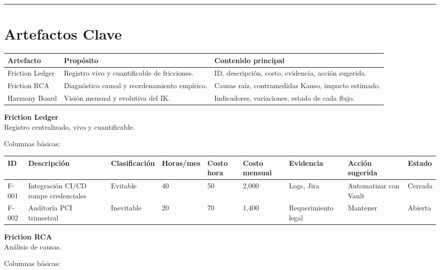 \hrule
\section{Artefactos Clave}

\begin{center}
\begin{tabular}{|p{3.5cm}|p{4.5cm}|p{5cm}|}
\hline
Artefacto & Propósito & Contenido principal \\ \hline
Friction Ledger & Registro vivo y cuantificable de fricciones. & ID, descripción, costo, evidencia, acción sugerida. \\ \hline
Friction RCA & Diagnóstico causal y reordenamiento empírico. & Causas raíz, contramedidas Kanso, impacto estimado. \\ \hline
Harmony Board & Visión mensual y evolutiva del IK. & Indicadores, variaciones, estado de cada flujo. \\ \hline
\end{tabular}
\end{center}

\textbf{Friction Ledger} \\
Registro centralizado, vivo y cuantificable.

Columnas básicas:

\begin{center}
\scriptsize
\begin{tabular}{|l|p{2.5cm}|l|l|l|l|p{2cm}|p{2cm}|l|}
\hline
ID & Descripción & Clasificación & Horas/mes & Costo hora & Costo mensual & Evidencia & Acción sugerida & Estado \\ \hline
F-001 & Integración CI/CD rompe credenciales & Evitable & 40 & 50 & 2,000 & Logs, Jira & Automatizar con Vault & Cerrada \\ \hline
F-002 & Auditoría PCI trimestral & Inevitable & 20 & 70 & 1,400 & Requerimiento legal & Mantener & Abierta \\ \hline
\end{tabular}
\end{center}

\textbf{Friction RCA} \\
Análisis de causas.

Columnas básicas:

